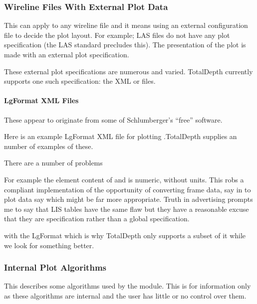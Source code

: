 \documentclass[letterpaper,10pt,english]{sphinxmanual}
\begin{document}
\subsubsection{Wireline Files With External Plot Data}
\label{\detokenize{tech/plotting:wireline-files-with-external-plot-data}}
This can apply to any wireline file and it means using an external configuration file to decide the plot layout. For example; LAS files do not have any plot specification (the LAS standard precludes this). The presentation of the plot is made with an external plot specification.

These external plot specifications are numerous and varied. TotalDepth currently supports one such specification: the XML  or  files.


\paragraph{LgFormat XML Files}
\label{\detokenize{tech/plotting:lgformat-xml-files}}
These appear to originate from some of Schlumberger’s “free” software.

Here is an example LgFormat XML file for plotting  .TotalDepth supplies an number of examples of these.

There are a number of problems %
\begin{footnote}[1]\sphinxAtStartFootnote
For example the  element content of  and  is numeric, without units. This robs a compliant implementation of the opportunity of converting frame data, say in  to plot data say  which might be far more appropriate. Truth in advertising prompts me to say that LIS  tables have the same flaw but they have a reasonable excuse that they are  specification rather than a global specification.
%
\end{footnote} with the LgFormat which is why TotalDepth only supports a subset of it while we look for something better.


\subsubsection{Internal Plot Algorithms}
\label{\detokenize{tech/plotting:internal-plot-algorithms}}
This describes some algorithms used by the  module. This is for information only as these algorithms are internal and the user has little or no control over them.
\end{document}

